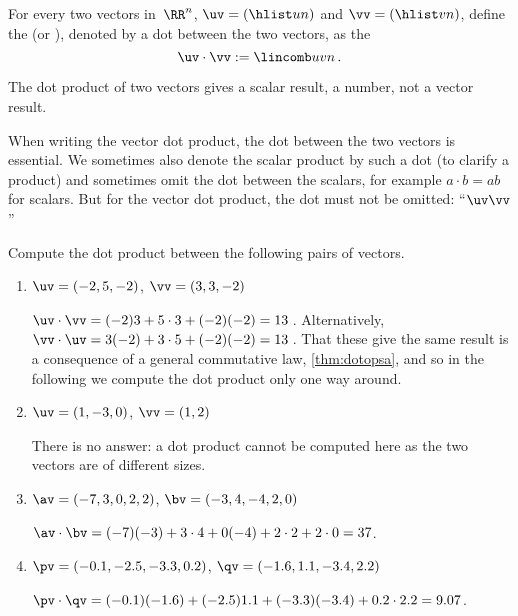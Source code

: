 \begin{definition} \label{def:dotprod}
For every two vectors in~\(\RR^n\), $\uv=(\hlist un)$ and $\vv=(\hlist vn)$,
define the  (or ), denoted by a dot between the two vectors, as the 
\begin{equation*}
\uv\cdot \vv:= \lincomb uvn\,.
\end{equation*}
\end{definition}

The dot product of two vectors gives a scalar result, a number, not a vector result.

When writing the vector dot product, the dot between the two vectors is essential.
We sometimes also denote the scalar product by such a dot (to clarify a product) and sometimes omit the dot between the scalars, for example \(a\cdot b=ab\) for scalars. 
But for the vector dot product, the dot must not be omitted: ``\(\uv\vv\)'' 


\begin{example} 
Compute the dot product between the following pairs of vectors.
\begin{enumerate}
\item \(\uv=(-2,5,-2)\), \(\vv=(3,3,-2)\)
\begin{solution} 
\(\uv\cdot\vv=(-2)3+5\cdot3+(-2)(-2)=13\)\,. 
Alternatively, \(\vv\cdot\uv=3(-2)+3\cdot5+(-2)(-2)=13\)\,.
That these give the same result is a consequence of a general commutative law, \cref{thm:dotopsa}, and so in the following we compute the dot product only one way around.
\end{solution}

\item \(\uv=(1,-3,0)\), \(\vv=(1,2)\)
\begin{solution} 
There is no answer: a dot product cannot be computed here as the two vectors are of different sizes. 
\end{solution}


\item \(\av=(-7,3,0,2,2)\), \(\bv=(-3,4,-4,2,0)\)
\begin{solution} 
\(\av\cdot\bv=(-7)(-3)+3\cdot4+0(-4)+2\cdot2+2\cdot0=37\). 
\end{solution}


\item \(\pv=(-0.1,-2.5,-3.3,0.2)\), \(\qv=(-1.6,1.1,-3.4,2.2)\)
\begin{solution} 
\(\pv\cdot\qv=(-0.1)(-1.6)+(-2.5)1.1+(-3.3)(-3.4)+0.2\cdot2.2=9.07\).
\end{solution}
\end{enumerate}
\end{example}



